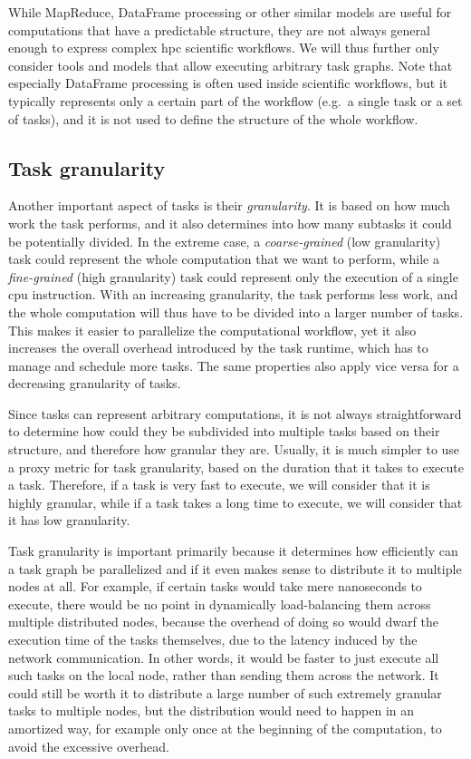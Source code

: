While MapReduce, DataFrame processing or other similar models are useful for computations that have
a predictable structure, they are not always general enough to express complex
\gls{hpc} scientific workflows. We will thus further only consider tools and models
that allow executing arbitrary task graphs. Note that especially DataFrame processing is often used
inside scientific workflows, but it typically represents only a certain part of the workflow (e.g.\
a single task or a set of tasks), and it is not used to define the structure of the whole workflow.

\subsection{Task granularity}
Another important aspect of tasks is their \emph{granularity}. It is based on how much work
the task performs, and it also determines into how many subtasks it could be potentially divided.
In the extreme case, a \emph{coarse-grained} (low granularity) task could represent the whole computation that we
want to perform, while a \emph{fine-grained} (high granularity) task could represent only the execution of a
single \gls{cpu} instruction. With an increasing granularity, the task performs less
work, and the whole computation will thus have to be divided into a larger number of tasks. This
makes it easier to parallelize the computational workflow, yet it also increases the overall
overhead introduced by the task runtime, which has to manage and schedule more tasks. The same
properties also apply vice versa for a decreasing granularity of tasks.

Since tasks can represent arbitrary computations, it is not always straightforward to determine how
could they be subdivided into multiple tasks based on their structure, and therefore how granular
they are. Usually, it is much simpler to use a proxy metric for task granularity, based on the
duration that it takes to execute a task. Therefore, if a task is very fast to execute, we will
consider that it is highly granular, while if a task takes a long time to execute, we will consider
that it has low granularity.

Task granularity is important primarily because it determines how efficiently can a task graph be
parallelized and if it even makes sense to distribute it to multiple nodes at all. For example, if
certain tasks would take mere nanoseconds to execute, there would be no point in dynamically
load-balancing them across multiple distributed nodes, because the overhead of doing so would dwarf
the execution time of the tasks themselves, due to the latency induced by the network
communication. In other words, it would be faster to just execute all such tasks on the local node,
rather than sending them across the network. It could still be worth it to distribute a large
number of such extremely granular tasks to multiple nodes, but the distribution would need to
happen in an amortized way, for example only once at the beginning of the computation, to avoid the
excessive overhead.

